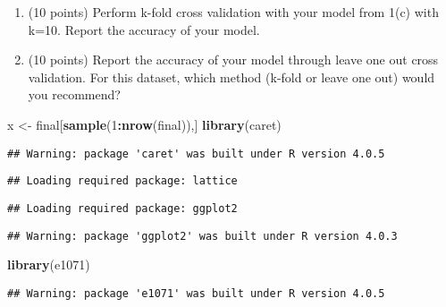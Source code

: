 \documentclass[
]{article}
\newenvironment{Shaded}{\begin{snugshade}}{\end{snugshade}}
\newcommand{\DecValTok}[1]{\textcolor[rgb]{0.00,0.00,0.81}{#1}}
\newcommand{\KeywordTok}[1]{\textcolor[rgb]{0.13,0.29,0.53}{\textbf{#1}}}
\newcommand{\NormalTok}[1]{#1}
\newcommand{\OperatorTok}[1]{\textcolor[rgb]{0.81,0.36,0.00}{\textbf{#1}}}
\newcommand{\StringTok}[1]{\textcolor[rgb]{0.31,0.60,0.02}{#1}}
\providecommand{\tightlist}{%
  \setlength{\itemsep}{0pt}\setlength{\parskip}{0pt}}
\begin{document}
\begin{enumerate}
\def\labelenumi{(\alph{enumi})}
\tightlist
\item
  (10 points) Perform k-fold cross validation with your model from 1(c)
  with k=10. Report the accuracy of your model.
\item
  (10 points) Report the accuracy of your model through leave one out
  cross validation. For this dataset, which method (k-fold or leave one
  out) would you recommend?
\end{enumerate}

\begin{Shaded}
\begin{Highlighting}[]
\NormalTok{x <-}\StringTok{ }\NormalTok{final[}\KeywordTok{sample}\NormalTok{(}\DecValTok{1}\OperatorTok{:}\KeywordTok{nrow}\NormalTok{(final)),]}
\KeywordTok{library}\NormalTok{(caret)}
\end{Highlighting}
\end{Shaded}

\begin{verbatim}
## Warning: package 'caret' was built under R version 4.0.5
\end{verbatim}

\begin{verbatim}
## Loading required package: lattice
\end{verbatim}

\begin{verbatim}
## Loading required package: ggplot2
\end{verbatim}

\begin{verbatim}
## Warning: package 'ggplot2' was built under R version 4.0.3
\end{verbatim}

\begin{Shaded}
\begin{Highlighting}[]
\KeywordTok{library}\NormalTok{(e1071)}
\end{Highlighting}
\end{Shaded}

\begin{verbatim}
## Warning: package 'e1071' was built under R version 4.0.5
\end{verbatim}
\end{document}
